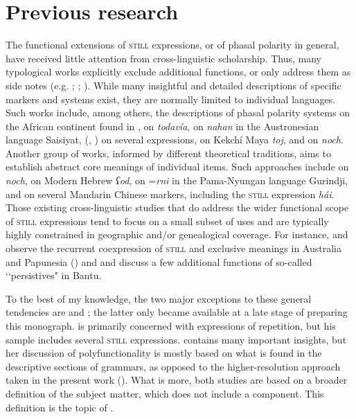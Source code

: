 \section{Previous research}
\label{sectionPreviousResearch}
The functional extensions of \textsc{still} expressions, or of phasal polarity in general, have received little attention from cross-linguistic scholarship. Thus, many typological works explicitly exclude additional functions, or only address them as side notes (e.g. \cite{vanderAuwera1998}; \cite{vanBaar1997}; \cite{VeselinovEtAl}). While many insightful and detailed descriptions of specific markers and systems exist, they are normally limited to individual languages. Such works include, among others, the descriptions of phasal polarity systems on the African continent found in \textcite{Kramer2021a}, \textcite{Bosque2016} on  \textit{todavía}, \textcite{Huang2007} on \textit{nahan} in the Austronesian language Saisiyat, \citeauthor{MosegaardHansen2002} (\citeyear{MosegaardHansen2002}, \citeyear{MosegaardHansen2008}) on several  expressions, \textcite{Kockelman2020} on Kekchí Maya \textit{toj}, and \textcite{Shetter1966} on  \textit{noch}. Another group of works, informed by different theoretical traditions, aims to establish abstract core meanings of individual items. Such approaches include \textcite{Beck2020} on  \textit{noch}, \textcite{Greenberg2012} on Modern Hebrew \textit{ʕod}, \textcite{McConvell1983} on \mbox{=\textit{rni}} in the Pama-Nyungan language Gurindji, and \textcite{JingSchmidtGries2009} on several Mandarin Chinese markers, including the \textsc{still} expression \textit{hái}. Those existing cross-linguistic studies that do address the wider functional scope of \textsc{still} expressions tend to focus on a small subset of uses and are typically highly constrained in geographic and/or genealogical coverage. For instance, \textcite{vanBaar1991} and \textcite{SchultzeBerndt2002} observe the recurrent coexpression of \textsc{still} and exclusive meanings  in Australia and Papunesia () and \textcite{Gueldemann1998} and \textcite{VeselinovaDevos2021} discuss a few additional functions of so-called \lq\lq persistives" in Bantu.

To the best of my knowledge, the two major exceptions to these general tendencies are \textcite{Zhang2017} and \textcite{Panova2021}; the latter only became available at a late stage of preparing this monograph. \textcite{Zhang2017} is primarily concerned with expressions of repetition, but his sample includes several \textsc{still} expressions. \textcite{Panova2021} contains many important insights, but her discussion of polyfunctionality is mostly based on what is found in the descriptive sections of grammars, as opposed to the higher-resolution approach taken in the present work (). What is more, both studies are based on a broader definition of the subject matter, which does not include a  component. This definition is the topic of .

